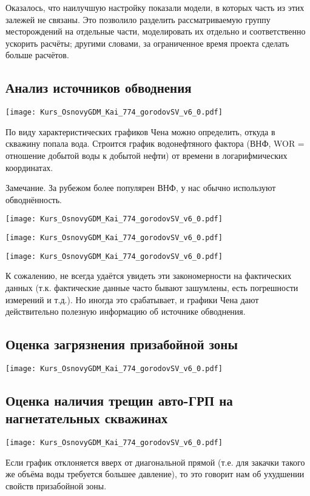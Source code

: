 \documentclass[main.tex]{subfiles}
\begin{document}
Оказалось, что наилучшую настройку показали модели, в которых часть из этих залежей не связаны.
Это позволило разделить рассматриваемую группу месторождений на отдельные части, моделировать их отдельно и соответственно ускорить расчёты; другими словами, за ограниченное время проекта сделать больше расчётов.

\subsection{Анализ источников обводнения}

\texttt{[image: Kurs\_OsnovyGDM\_Kai\_774\_gorodovSV\_v6\_0.pdf]}

По виду характеристических графиков Чена можно определить, откуда в скважину попала вода.
Строится график водонефтяного фактора (ВНФ, WOR = отношение добытой воды к добытой нефти) от времени в логарифмических координатах.

Замечание. За рубежом более популярен ВНФ, у нас обычно используют обводнённость.

\texttt{[image: Kurs\_OsnovyGDM\_Kai\_774\_gorodovSV\_v6\_0.pdf]}

\texttt{[image: Kurs\_OsnovyGDM\_Kai\_774\_gorodovSV\_v6\_0.pdf]}

\texttt{[image: Kurs\_OsnovyGDM\_Kai\_774\_gorodovSV\_v6\_0.pdf]}

К сожалению, не всегда удаётся увидеть эти закономерности на фактических данных (т.к. фактические данные часто бывают зашумлены, есть погрешности измерений и т.д.).
Но иногда это срабатывает, и графики Чена дают действительно полезную информацию об источнике обводнения.

\subsection{Оценка загрязнения призабойной зоны}

\texttt{[image: Kurs\_OsnovyGDM\_Kai\_774\_gorodovSV\_v6\_0.pdf]}

\subsection{Оценка наличия трещин авто-ГРП на нагнетательных скважинах}

\texttt{[image: Kurs\_OsnovyGDM\_Kai\_774\_gorodovSV\_v6\_0.pdf]}

Если график отклоняется вверх от диагональной прямой (т.е. для закачки такого же объёма воды требуется большее давление), то это говорит нам об ухудшении свойств призабойной зоны.
\end{document}
